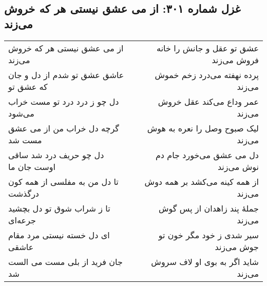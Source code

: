 \begin{center}
\section*{غزل شماره ۳۰۱: از می عشق نیستی هر که خروش می‌زند}
\label{sec:301}
\begin{longtable}{l p{0.5cm} r}
از می عشق نیستی هر که خروش می‌زند
&&
عشق تو عقل و جانش را خانه فروش می‌زند
\\
عاشق عشق تو شدم از دل و جان که عشق تو
&&
پرده نهفته می‌درد زخم خموش می‌زند
\\
دل چو ز درد درد تو مست خراب می‌شود
&&
عمر وداع می‌کند عقل خروش می‌زند
\\
گرچه دل خراب من از می عشق مست شد
&&
لیک صبوح وصل را نعره به هوش می‌زند
\\
دل چو حریف درد شد ساقی اوست جان ما
&&
دل می عشق می‌خورد جام دم نوش می‌زند
\\
تا دل من به مفلسی از همه کون درگذشت
&&
از همه کینه می‌کشد بر همه دوش می‌زند
\\
تا ز شراب شوق تو دل بچشید جرعه‌ای
&&
جملهٔ پند زاهدان از پس گوش می‌زند
\\
ای دل خسته نیستی مرد مقام عاشقی
&&
سیر شدی ز خود مگر خون تو جوش می‌زند
\\
جان فرید از بلی مست می الست شد
&&
شاید اگر به بوی او لاف سروش می‌زند
\\
\end{longtable}
\end{center}
